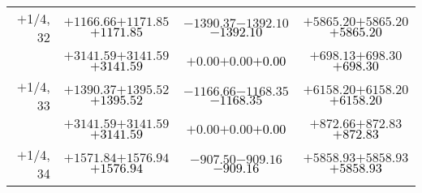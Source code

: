 \documentclass[compress]{beamer}
\begin{document}
\begin{frame}
{\begin{tabular}{r | c | c | c}
$+$1/4, 32 & $+1166.66$\hspace{0.1 cm}$+1171.85$\hspace{0.1 cm}\textcolor{black}{$+1171.85$} & $-1390.37$\hspace{0.1 cm}$-1392.10$\hspace{0.1 cm}\textcolor{black}{$-1392.10$} & $+5865.20$\hspace{0.1 cm}$+5865.20$\hspace{0.1 cm}\textcolor{black}{$+5865.20$} \\
           & $+3141.59$\hspace{0.1 cm}$+3141.59$\hspace{0.1 cm}\textcolor{black}{$+3141.59$} & $+0.00$\hspace{0.1 cm}$+0.00$\hspace{0.1 cm}\textcolor{black}{$+0.00$} & $+698.13$\hspace{0.1 cm}$+698.30$\hspace{0.1 cm}\textcolor{black}{$+698.30$} \\
$+$1/4, 33 & $+1390.37$\hspace{0.1 cm}$+1395.52$\hspace{0.1 cm}\textcolor{black}{$+1395.52$} & $-1166.66$\hspace{0.1 cm}$-1168.35$\hspace{0.1 cm}\textcolor{black}{$-1168.35$} & $+6158.20$\hspace{0.1 cm}$+6158.20$\hspace{0.1 cm}\textcolor{black}{$+6158.20$} \\
           & $+3141.59$\hspace{0.1 cm}$+3141.59$\hspace{0.1 cm}\textcolor{black}{$+3141.59$} & $+0.00$\hspace{0.1 cm}$+0.00$\hspace{0.1 cm}\textcolor{black}{$+0.00$} & $+872.66$\hspace{0.1 cm}$+872.83$\hspace{0.1 cm}\textcolor{black}{$+872.83$} \\
$+$1/4, 34 & $+1571.84$\hspace{0.1 cm}$+1576.94$\hspace{0.1 cm}\textcolor{black}{$+1576.94$} & $-907.50$\hspace{0.1 cm}$-909.16$\hspace{0.1 cm}\textcolor{black}{$-909.16$} & $+5858.93$\hspace{0.1 cm}$+5858.93$\hspace{0.1 cm}\textcolor{black}{$+5858.93$} \\

\end{tabular}}
\end{frame}
\end{document}
